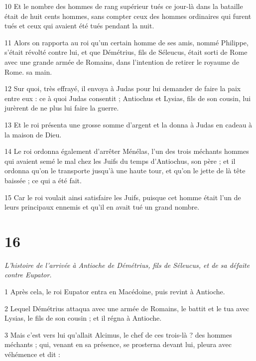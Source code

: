 \par 10 Et le nombre des hommes de rang supérieur tués ce jour-là dans la bataille était de huit cents hommes, sans compter ceux des hommes ordinaires qui furent tués et ceux qui avaient été tués pendant la nuit.

\par 11 Alors on rapporta au roi qu'un certain homme de ses amis, nommé Philippe, s'était révolté contre lui, et que Démétrius, fils de Séleucus, était sorti de Rome avec une grande armée de Romains, dans l'intention de retirer le royaume de Rome. sa main.

\par 12 Sur quoi, très effrayé, il envoya à Judas pour lui demander de faire la paix entre eux : ce à quoi Judas consentit ; Antiochus et Lysias, fils de son cousin, lui jurèrent de ne plus lui faire la guerre.

\par 13 Et le roi présenta une grosse somme d'argent et la donna à Judas en cadeau à la maison de Dieu.

\par 14 Le roi ordonna également d'arrêter Ménélas, l'un des trois méchants hommes qui avaient semé le mal chez les Juifs du temps d'Antiochus, son père ; et il ordonna qu'on le transporte jusqu'à une haute tour, et qu'on le jette de là tête baissée ; ce qui a été fait.

\par 15 Car le roi voulait ainsi satisfaire les Juifs, puisque cet homme était l'un de leurs principaux ennemis et qu'il en avait tué un grand nombre.

\chapter{16}

\par \textit{L'histoire de l'arrivée à Antioche de Démétrius, fils de Séleucus, et de sa défaite contre Eupator.}

\par 1 Après cela, le roi Eupator entra en Macédoine, puis revint à Antioche.

\par 2 Lequel Démétrius attaqua avec une armée de Romains, le battit et le tua avec Lysias, le fils de son cousin ; et il régna à Antioche.

\par 3 Mais c'est vers lui qu'allait Alcimus, le chef de ces trois-là ? des hommes méchants ; qui, venant en sa présence, se prosterna devant lui, pleura avec véhémence et dit :

